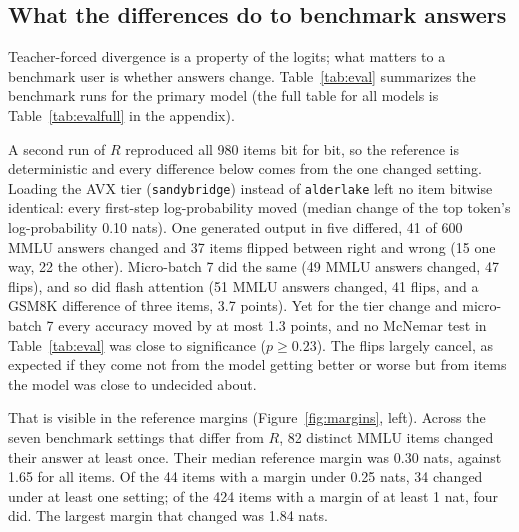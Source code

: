 \subsection{What the differences do to benchmark answers}
Teacher-forced divergence is a property of the logits; what matters to a benchmark user is
whether answers change. Table~\ref{tab:eval} summarizes the benchmark runs for the primary model
(the full table for all models is Table~\ref{tab:evalfull} in the appendix).

\begin{table}[t]
\centering\small
\caption{Benchmark runs of Qwen3-0.6B Q4\_K\_M against the reference run $R$ (980 items: 600
MMLU, 300 TriviaQA, 80 GSM8K). ``ident.'': items whose tokens and log-probabilities are bitwise
equal to $R$. ``same out'': items whose generated tokens are equal. Flips are over all 980
items, reference right and other wrong / reference wrong and other right. $p$: exact McNemar
test on the flips. The last row compares the two \texttt{server4} runs with each other.}
\label{tab:eval}
\footnotesize\setlength{\tabcolsep}{4pt}

\end{table}

A second run of $R$ reproduced all 980 items bit for bit, so the reference is deterministic and
every difference below comes from the one changed setting. Loading the AVX tier
(\texttt{sandybridge}) instead of \texttt{alderlake} left no item bitwise identical: every
first-step log-probability moved (median change of the top token's log-probability 0.10 nats).
One generated output in five differed, 41 of 600 MMLU answers changed and 37 items flipped
between right and wrong (15 one way, 22 the other). Micro-batch 7 did the same (49 MMLU answers
changed, 47 flips), and so did flash attention (51 MMLU answers changed, 41 flips, and a GSM8K
difference of three items, 3.7 points). Yet for the tier change and micro-batch 7 every accuracy
moved by at most 1.3 points, and no McNemar test in Table~\ref{tab:eval} was close to
significance ($p\ge0.23$). The flips largely cancel, as expected if they come not from the model getting
better or worse but from items the model was close to undecided about.

That is visible in the reference margins (Figure~\ref{fig:margins}, left). Across the seven
benchmark settings that differ from $R$, 82 distinct MMLU items changed their answer at least
once. Their median reference margin was 0.30 nats, against 1.65 for all items. Of the 44 items
with a margin under 0.25 nats, 34 changed under at least one setting; of the 424 items with a
margin of at least 1 nat, four did. The largest margin that changed was 1.84 nats.

